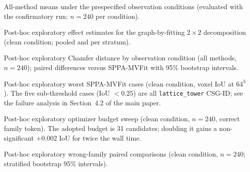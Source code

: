 \documentclass[10pt]{article}
\begin{document}
\begin{table}[!htbp]
\centering
\scriptsize
\caption{All-method means under the prespecified observation conditions
(evaluated with the confirmatory run; \(n{=}240\) per condition).}
\label{tab:supp-robustness-all-methods}

\end{table}

\begin{table}[!htbp]
\centering
\scriptsize
\caption{Post-hoc exploratory effect estimates for the graph-by-fitting
\(2\times2\) decomposition (clean condition; pooled and per stratum).}
\label{tab:supp-graph-fitting-effects}

\end{table}

\begin{table}[!htbp]
\centering
\scriptsize
\caption{Post-hoc exploratory Chamfer distance by observation condition
(all methods, \(n{=}240\)); paired differences versus SPPA-MVFit with 95\%
bootstrap intervals.}
\label{tab:supp-chamfer-conditions}

\end{table}

\begin{table}[!htbp]
\centering
\scriptsize
\caption{Post-hoc exploratory worst SPPA-MVFit cases (clean condition,
voxel IoU at \(64^3\)). The five sub-threshold cases (IoU \(<0.25\)) are all
\texttt{lattice\_tower} CSG-ID; see the failure analysis in Section~4.2 of the
main paper.}
\label{tab:supp-worst-cases}

\end{table}

\begin{table}[!htbp]
\centering
\scriptsize
\caption{Post-hoc exploratory optimizer budget sweep (clean condition,
\(n{=}240\), correct family token). The adopted budget is 31 candidates;
doubling it gains a non-significant \(+0.002\) IoU for twice the wall time.}
\label{tab:supp-budget-sweep}

\end{table}

\begin{table}[!htbp]
\centering
\scriptsize
\caption{Post-hoc exploratory wrong-family paired comparisons (clean
condition, \(n{=}240\); stratified bootstrap 95\% intervals).}
\label{tab:supp-wrong-family-comparisons}

\end{table}
\end{document}
